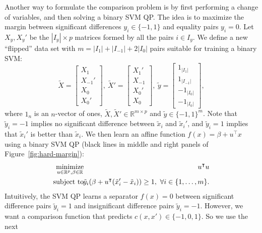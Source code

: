 \documentclass{article}
\newcommand{\RR}{\mathbb R}
\DeclareMathOperator*{\minimize}{minimize}
\begin{document}
Another way to formulate the comparison problem is by first performing
a change of variables, and then solving a binary SVM QP. The idea is to
maximize the margin between significant differences $y_i\in\{-1,1\}$
and equality pairs $y_i=0$. Let $X_y,X_y'$ be the $|I_y|\times p$
matrices formed by all the pairs $i\in I_y$. We define a new
``flipped'' data set with $m=|I_1|+|I_{-1}|+2|I_0|$ pairs suitable for
training a binary SVM:
\begin{equation}
\label{eq:tilde}
  \tilde X = \left[
    \begin{array}{c}
      X_1 \\
      X_{-1}'\\
      X_0\\
      X_0'
    \end{array}
  \right],\ 
  \tilde X' = \left[
    \begin{array}{c}
      X_1' \\
      X_{-1}\\
      X_0'\\
      X_0
    \end{array}
  \right],\ 
  \tilde y = \left[
    \begin{array}{c}
      1_{|I_1|} \\
      1_{|I_{-1}|}\\
      -1_{|I_0|}\\
      -1_{|I_0|}
    \end{array}
  \right],
\end{equation}
where $1_n$ is an $n$-vector of ones, $\tilde X,\tilde
X'\in\RR^{m\times p}$ and $\tilde y\in\{-1,1\}^m$. Note that $\tilde
y_i=-1$ implies no significant difference between $\tilde x_i$ and
$\tilde x_i'$, and $\tilde y_i=1$ implies that $\tilde x_i'$ is better
than $\tilde x_i$. We then learn an affine function
$f(x)=\beta+u^\intercal x$ using a binary SVM QP (black lines in
middle and right panels of Figure~\ref{fig:hard-margin}):
\begin{eqnarray}
  \label{eq:max-margin-qp-tilde}
  \minimize_{u\in\RR^p, \beta\in\RR}\ &&\hskip -0.5cm
 u^\intercal u  \\
\nonumber    \text{subject to}\ &&\hskip -0.5cm 
    \tilde y_i (\beta + u^\intercal( \tilde x_i'-\tilde x_i) ) \geq 1,
    \ \forall i\in\{1,\dots,m\}.
\end{eqnarray}
Intuitively, the SVM QP learns a separator $f(x)=0$ between
significant difference pairs $\tilde y_i=1$ and insignificant
difference pairs $\tilde y_i=-1$. However, we want a comparison
function that predicts $c(x,x')\in\{-1,0,1\}$. So we use the next
\end{document}
